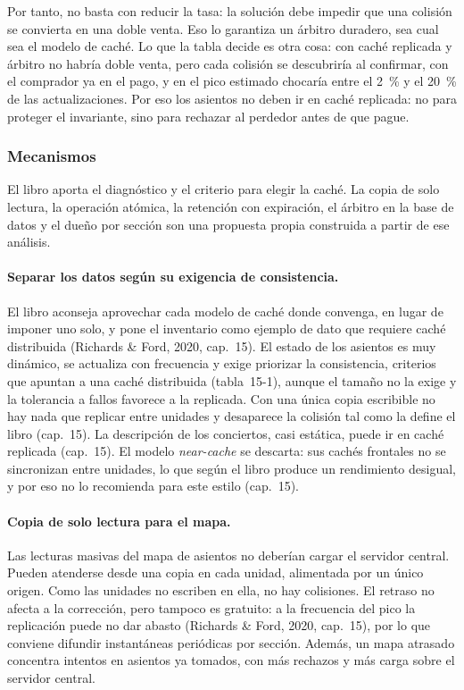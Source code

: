 Por tanto, no basta con reducir la tasa: la solución debe impedir que una colisión se
convierta en una doble venta. Eso lo garantiza un árbitro duradero, sea cual sea el
modelo de caché. Lo que la tabla decide es otra cosa: con caché replicada y árbitro no
habría doble venta, pero cada colisión se descubriría al confirmar, con el comprador
ya en el pago, y en el pico estimado chocaría entre el 2~\% y el 20~\% de las
actualizaciones. Por eso los asientos no deben ir en caché replicada: no para proteger
el invariante, sino para rechazar al perdedor antes de que pague.

\subsubsection{Mecanismos}

El libro aporta el diagnóstico y el criterio para elegir la caché. La copia de solo
lectura, la operación atómica, la retención con expiración, el árbitro en la base de
datos y el dueño por sección son una propuesta propia construida a partir de ese
análisis.

\paragraph{Separar los datos según su exigencia de consistencia.}
El libro aconseja aprovechar cada modelo de caché donde convenga, en lugar de imponer
uno solo, y pone el inventario como ejemplo de dato que requiere caché distribuida
(Richards \& Ford, 2020, cap.~15). El estado de los asientos es muy dinámico, se
actualiza con frecuencia y exige priorizar la consistencia, criterios que apuntan a una
caché distribuida (tabla~15-1), aunque el tamaño no la exige y la tolerancia a fallos
favorece a la replicada. Con una única copia escribible no hay nada que replicar entre
unidades y desaparece la colisión tal como la define el libro (cap.~15). La descripción
de los conciertos, casi estática, puede ir en caché replicada (cap.~15). El modelo
\emph{near-cache} se descarta: sus cachés frontales no se sincronizan entre unidades,
lo que según el libro produce un rendimiento desigual, y por eso no lo recomienda para
este estilo (cap.~15).

\paragraph{Copia de solo lectura para el mapa.}
Las lecturas masivas del mapa de asientos no deberían cargar el servidor central.
Pueden atenderse desde una copia en cada unidad, alimentada por un único origen. Como
las unidades no escriben en ella, no hay colisiones. El retraso no afecta a la
corrección, pero tampoco es gratuito: a la frecuencia del pico la replicación puede no
dar abasto (Richards \& Ford, 2020, cap.~15), por lo que conviene difundir instantáneas
periódicas por sección. Además, un mapa atrasado concentra intentos en asientos ya
tomados, con más rechazos y más carga sobre el servidor central.

